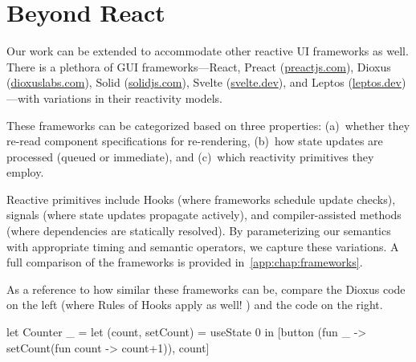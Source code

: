 \section{Beyond React}
Our work can be extended to accommodate other reactive UI frameworks as well.
There is a plethora of GUI frameworks---React, Preact (\href{https://preactjs.com/}{preactjs.com}), Dioxus (\href{https://dioxuslabs.com/}{dioxuslabs.com}), Solid (\href{https://www.solidjs.com/}{solidjs.com}), Svelte (\href{https://svelte.dev/}{svelte.dev}), and Leptos (\href{https://leptos.dev/}{leptos.dev})---with variations in their reactivity models.

These frameworks can be categorized based on three properties: (a)~whether they re-read component specifications for re-rendering, (b)~how state updates are processed (queued or immediate), and (c)~which reactivity primitives they employ.

Reactive primitives include Hooks (where frameworks schedule update checks), signals (where state updates propagate actively), and compiler-assisted methods (where dependencies are statically resolved).
By parameterizing our semantics with appropriate timing and semantic operators, we capture these variations.
A full comparison of the frameworks is provided in~\cref{app:chap:frameworks}.

As a reference to how similar these frameworks can be, compare the Dioxus code on the left (where Rules of Hooks apply as well! \citep{Dio25Hooks}) and the \Rtrace{} code on the right.
\begin{center}
  \begin{minipage}{0.48\linewidth}
    \begin{reactcode}
pub fn Counter() -> Element {
  let mut count = use_signal(|| 0);
  rsx! { button { onclick: move |_|
    count += 1, "{count}" } }
    \end{reactcode}
  \end{minipage}%
  \begin{minipage}{0.48\linewidth}
    \begin{reactcode}
let Counter _ =
  let (count, setCount) = useState 0 in
  [button (fun _ ->
    setCount(fun count -> count+1)), count]
    \end{reactcode}
  \end{minipage}
\end{center}
